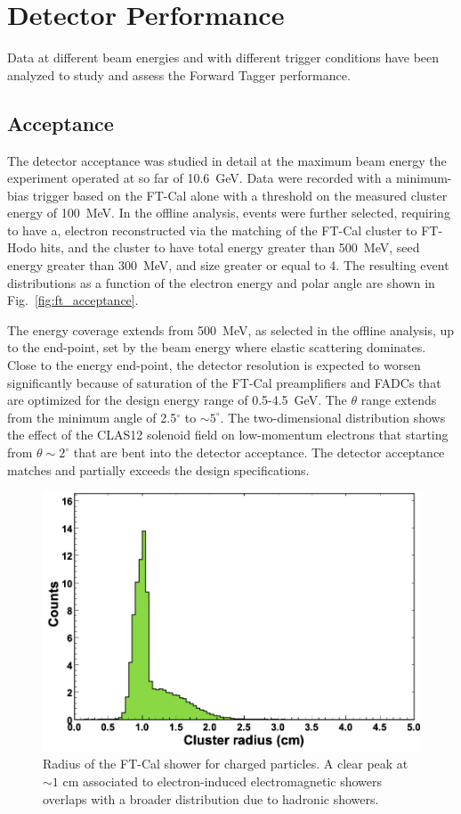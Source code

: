 \section{Detector Performance}

Data at different beam energies and with different trigger conditions have been analyzed to study and assess the
Forward Tagger performance. 

\subsection{Acceptance}

The detector acceptance was studied in detail at the maximum beam energy the experiment operated at so far of
10.6~GeV. Data were recorded with a minimum-bias trigger based on the FT-Cal alone with a threshold on the
measured cluster energy of 100~MeV. In the offline analysis, events were further selected, requiring to have a,
electron reconstructed via the matching of the FT-Cal cluster to FT-Hodo hits, and the cluster to have total energy
greater than 500~MeV, seed energy greater than 300~MeV, and size greater or equal to 4. The resulting event
distributions as a function of the electron energy and polar angle are shown in Fig.~\ref{fig:ft_acceptance}. 

The energy coverage extends from 500~MeV, as selected in the offline analysis, up to the end-point, set by the
beam energy where elastic scattering dominates. Close to the energy end-point, the detector resolution is expected
to worsen significantly because of saturation of the FT-Cal preamplifiers and FADCs that are optimized for the
design energy range of 0.5-4.5~GeV. The $\theta$ range extends from the minimum angle of 2.5$^\circ$ to
$\sim5^\circ$. The two-dimensional distribution shows the effect of the CLAS12 solenoid field on low-momentum
electrons that starting from $\theta\sim2^\circ$ that are bent into the detector acceptance. The detector
acceptance matches and partially exceeds the design specifications. 

\begin{figure}[h]
\includegraphics[height=0.65\columnwidth]{fig/ft_shower.png}
\caption{Radius of the FT-Cal shower for charged particles. A clear peak at $\sim 1$ cm associated to
  electron-induced electromagnetic showers overlaps with a broader distribution due to hadronic showers.}
\label{fig:ft_shower}
\end{figure}

